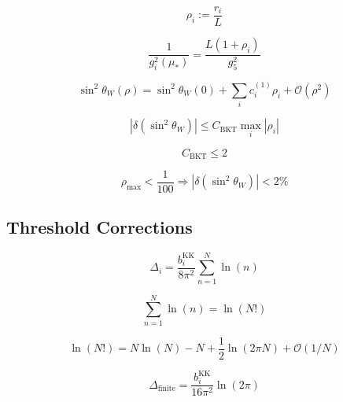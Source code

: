 \documentclass[11pt,a4paper]{article}
\theoremstyle{definition}
\begin{document}
\begin{equation}
\label{eq:bkt_ext_1}
\rho_i := \frac{r_i}{L}
\end{equation}

\begin{equation}
\label{eq:bkt_ext_2}
\frac{1}{g_i^2(\mu_*)} = \frac{L(1 + \rho_i)}{g_5^2}
\end{equation}

\begin{equation}
\label{eq:bkt_ext_3}
\sin^2\theta_W(\rho) = \sin^2\theta_W(0) + \sum_i c_i^{(1)}\rho_i + \mathcal{O}(\rho^2)
\end{equation}

\begin{equation}
\label{eq:bkt_ext_4}
|\delta(\sin^2\theta_W)| \leq C_{\text{BKT}}\max_i|\rho_i|
\end{equation}

\begin{equation}
\label{eq:bkt_ext_5}
C_{\text{BKT}} \leq 2
\end{equation}

\begin{equation}
\label{eq:bkt_ext_6}
\rho_{\max} < \frac{1}{100} \Rightarrow |\delta(\sin^2\theta_W)| < 2\%
\end{equation}

\subsection{Threshold Corrections}
\label{subsec:threshold_extended}

\begin{equation}
\label{eq:th_ext_1}
\Delta_i = \frac{b_i^{\text{KK}}}{8\pi^2}\sum_{n=1}^{N}\ln(n)
\end{equation}

\begin{equation}
\label{eq:th_ext_2}
\sum_{n=1}^{N}\ln(n) = \ln(N!)
\end{equation}

\begin{equation}
\label{eq:th_ext_3}
\ln(N!) = N\ln(N) - N + \frac{1}{2}\ln(2\pi N) + \mathcal{O}(1/N)
\end{equation}

\begin{equation}
\label{eq:th_ext_4}
\Delta_{\text{finite}} = \frac{b_i^{\text{KK}}}{16\pi^2}\ln(2\pi)
\end{equation}
\end{document}
